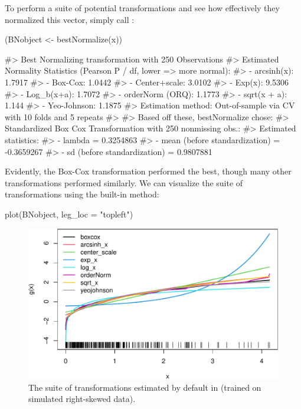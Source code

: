 To perform a suite of potential transformations and see how effectively
they normalized this vector, simply call :

\begin{Schunk}
\begin{Sinput}
(BNobject <- bestNormalize(x))
\end{Sinput}
\begin{Soutput}
#> Best Normalizing transformation with 250 Observations
#>  Estimated Normality Statistics (Pearson P / df, lower => more normal):
#>  - arcsinh(x): 1.7917
#>  - Box-Cox: 1.0442
#>  - Center+scale: 3.0102
#>  - Exp(x): 9.5306
#>  - Log_b(x+a): 1.7072
#>  - orderNorm (ORQ): 1.1773
#>  - sqrt(x + a): 1.144
#>  - Yeo-Johnson: 1.1875
#> Estimation method: Out-of-sample via CV with 10 folds and 5 repeats
#>  
#> Based off these, bestNormalize chose:
#> Standardized Box Cox Transformation with 250 nonmissing obs.:
#>  Estimated statistics:
#>  - lambda = 0.3254863 
#>  - mean (before standardization) = -0.3659267 
#>  - sd (before standardization) = 0.9807881
\end{Soutput}
\end{Schunk}

Evidently, the Box-Cox transformation performed the best, though many
other transformations performed similarly. We can visualize the suite of
transformations using the built-in  method:

\begin{Schunk}
\begin{Sinput}
plot(BNobject, leg_loc = "topleft")
\end{Sinput}
\begin{figure}

{\centering \includegraphics[width=1\linewidth]{figs/bn_plot-1} 

}

\caption[The suite of transformations estimated by default in  (trained on simulated right-skewed data)]{The suite of transformations estimated by default in  (trained on simulated right-skewed data).}\label{fig:bn_plot}
\end{figure}
\end{Schunk}

